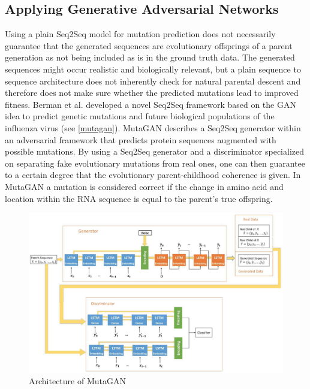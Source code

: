 \subsection{Applying Generative Adversarial Networks} \label{fundamentalsG}

Using a plain \ac{Seq2Seq} model for mutation prediction does not necessarily guarantee that the generated sequences are evolutionary offsprings of a parent generation as not being included as is in the ground truth data. The generated sequences might occur realistic and biologically relevant, but a plain sequence to sequence architecture does not inherently check for natural parental descent and therefore does not make sure whether the predicted mutations lead to improved fitness. Berman et al. \cite{Berman2020} developed a novel \ac{Seq2Seq} framework based on the \ac{GAN} idea to predict genetic mutations and future biological populations of the influenza virus (see \autoref{mutagan}). Muta\-GAN describes a \ac{Seq2Seq} generator within an adversarial framework that predicts protein sequences augmented with possible mutations. By using a \ac{Seq2Seq} generator and a discriminator specialized on separating fake evolutionary mutations from real ones, one can then guarantee to a certain degree that the evo\-lu\-tio\-na\-ry parent-childhood coherence is given. In MutaGAN a mutation is considered correct if the change in amino acid and location within the \ac{RNA} sequence is equal to the parent's true offspring. \cite{Berman2020}

\begin{figure}[ht]
	\centering
	\includegraphics[width=\linewidth]{figures/mutagan.png}
	\caption{Architecture of MutaGAN \cite{Berman2020}}
	\label{mutagan}
\end{figure}


